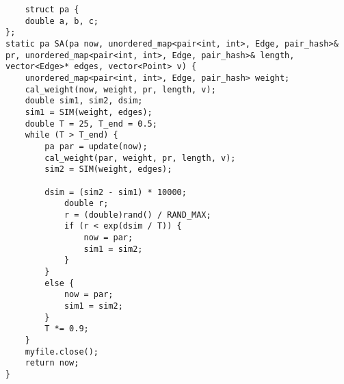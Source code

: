 \begin{verbatim}
    struct pa {
	double a, b, c;
};
static pa SA(pa now, unordered_map<pair<int, int>, Edge, pair_hash>& pr, unordered_map<pair<int, int>, Edge, pair_hash>& length, vector<Edge>* edges, vector<Point> v) {
	unordered_map<pair<int, int>, Edge, pair_hash> weight;
	cal_weight(now, weight, pr, length, v);
	double sim1, sim2, dsim;
	sim1 = SIM(weight, edges);
	double T = 25, T_end = 0.5;
	while (T > T_end) {
		pa par = update(now);
		cal_weight(par, weight, pr, length, v);
		sim2 = SIM(weight, edges);

		dsim = (sim2 - sim1) * 10000;
			double r;
			r = (double)rand() / RAND_MAX;
			if (r < exp(dsim / T)) {
				now = par;
				sim1 = sim2;
			}
		}
		else {
			now = par;
			sim1 = sim2;
		}
		T *= 0.9;
	}
	myfile.close();
	return now;
}
\end{verbatim}
   


